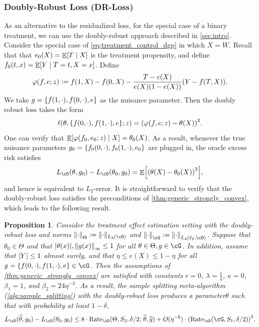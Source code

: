 \documentclass[11pt]{article} %
\newcommand{\pref}[1]{\cref{#1}}
\theoremstyle{theorem}  %
\newtheorem{proposition}{Proposition}
\theoremstyle{plain}
\DeclarePairedDelimiter{\abs}{\lvert}{\rvert} %
\DeclarePairedDelimiter{\brk}{[}{]}
\DeclarePairedDelimiter{\crl}{\{}{\}}
\DeclarePairedDelimiter{\prn}{(}{)}
\DeclarePairedDelimiter{\nrm}{\|}{\|}
\DeclareMathOperator{\En}{\mathbb{E}}
\newcommand{\ls}{\ell}
\newcommand{\ldef}{\vcentcolon=}
\newcommand{\wh}[1]{\widehat{#1}}
\newenvironment{revone}{\color{black}}{\ignorespacesafterend}
\newcommand{\bigoh}{O}
\newcommand{\vphi}{\varphi}
\newcommand{\midsem}{;\,}
\newcommand{\estone}{\wh{g}}
\newcommand{\esttwo}{\wh{\theta}}
\newcommand{\nuisance}{\cG}
\newcommand{\target}{\Theta}
\newcommand{\Rate}{\mathrm{Rate}_{\cD}}
\newcommand{\gtone}{g_0}
\newcommand{\gttwo}{\theta_0}
\newcommand{\sampleone}{S_1}
\newcommand{\sampletwo}{S_2}
\newcommand{\param}{parameter\xspace}
\begin{document}
\begin{revone}
\subsubsection{Doubly-Robust Loss (DR-Loss)}
As an alternative to the residualized loss, for the special case of  a binary treatment, we can use the doubly-robust approach described in \pref{sec:intro}. Consider the special case of \pref{eq:treatment_control_dgp} in which $X=W$. Recall that that $e_0(X)=\En\brk*{T\mid{}X}$ is the treatment propensity, and define $f_0(t,x)=\En\brk*{Y\mid{}T=t,X=x}$. Define
\[
\varphi(f,e;z) \ldef f(1,X) - f(0,X) - \frac{T-e(X)}{e(X)(1-e(X))}(Y-f(T,X)).\] 
%
%
We take $g=\crl*{f(1,\cdot),f(0,\cdot), e}$ as the nuisance parameter. Then the doubly robust loss takes the form
\begin{equation}
\label{eq:doubly_robust_treatment_loss}
\ls(\theta,\crl{f(0,\cdot),f(1,\cdot),e};z) = \prn*{\varphi(f,e;z)- \theta(X)}^{2}.
\end{equation}
%
%
%
%
One can verify that $\En\brk*{\vphi(f_0,e_0;z)\mid{}X}=\theta_0(X)$. As a result, whenever the true nuisance parameters $g_0=\crl{f_0(0,\cdot),f_0(1,\cdot),e_0}$ are plugged in, the oracle excess risk satisfies
%
\[
L_{\cD}(\theta,\gtone) - L_{\cD}(\gttwo,\gtone) = \En\brk*{\prn*{\theta(X)-\theta_{0}(X)}^{2}},
\]
and hence is equivalent to $L_2$-error.
%
%
%
%
%
%
It is straightforward to verify that the doubly-robust loss satisfies the preconditions of \pref{thm:generic_strongly_convex}, which leads to the following result.
%
\begin{proposition}
  \label{prop:doubly_robust}
  Consider the treatment effect estimation setting with the doubly-robust loss and norms $\nrm*{\cdot}_{\target}\ldef\nrm{\cdot}_{L_2(\cD)}$ and $\nrm*{\cdot}_{\cG}\ldef\nrm*{\cdot}_{L_4(\ell_2,\cD)}$. Suppose that $\gttwo\in\target$ and that $\abs{\theta(x)},\nrm*{g(x)}_{\infty}\leq{}1$ for all $\theta\in\target,g\in\nuisance$. In addition, assume that $\abs{Y}\leq{}1$ almost surely, and that $\eta{}\leq{}e(X)\leq{}1-\eta$ for all $g=\crl{f(0,\cdot),f(1,\cdot),e}\in\cG$. Then the assumptions of \pref{thm:generic_strongly_convex} are satisfied with constants $r=0$, $\lambda = \frac{1}{4}$,  $\kappa=0$, $\beta_1=1$, and $\beta_2= 24\eta^{-3}$. As a result, the sample splitting meta-algorithm (\pref{alg:sample_splitting}) with the doubly-robust loss produces a \param $\esttwo$ such that with probability at least $1-\delta$,
\begin{align*}
L_{\cD}(\esttwo,\gtone) - L_{\cD}(\gttwo, \gtone)
\leq{} 8\cdot{}\Rate(\target,\sampletwo,\delta/2\midsem{}\esttwo,\estone) +
  \bigoh(\eta^{-6})\cdot{}\prn*{
\Rate(\nuisance,\sampleone,\delta/2)
}^{4}.
\end{align*}
\end{proposition}


\end{revone}
\end{document}
